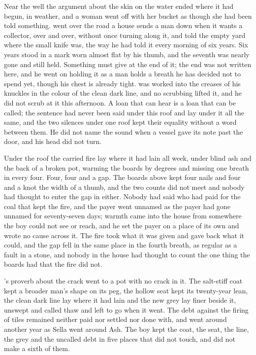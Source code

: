 Near the well the argument about the skin on the water ended where it had begun, in weather, and a woman went off with her bucket as though she had been told something.  went over the road a house sends a man down when it wants a collector, over and over, without once turning along it, and told the empty yard where the small knife was, the way he had told it every morning of six years. Six years stood in a mark worn almost flat by his thumb, and the seventh was nearly gone and still held. Something must give at the end of it; the end was not written here, and he went on holding it as a man holds a breath he has decided not to spend yet, though his chest is already tight.  was worked into the creases of his knuckles in the colour of the clean dark line, and no scrubbing lifted it, and he did not scrub at it this afternoon. A loan that can hear is a loan that can be called; the sentence had never been said under this roof and lay under it all the same, and the two silences under one roof kept their equality without a word between them. He did not name the sound when a vessel gave its note past the door, and his head did not turn.

\scenebreak

Under the roof the carried fire lay where it had lain all week, under blind ash and the back of a broken pot, warming the boards by degrees and missing one breath in every four. Four, four and a gap. The boards above kept four nails and four and a knot the width of a thumb, and the two counts did not meet and nobody had thought to enter the gap in either. Nobody had said who had paid for the coal that kept the fire, and the payer went unnamed as the payer had gone unnamed for seventy-seven days; warmth came into the house from somewhere the boy could not see or reach, and he set the payer on a place of its own and wrote no cause across it. The fire took what it was given and gave back what it could, and the gap fell in the same place in the fourth breath, as regular as a fault in a stone, and nobody in the house had thought to count the one thing the boards had that the fire did not.

's proverb about the crack went to a pot with no crack in it. The salt-stiff coat kept a broader man's shape on its peg, the hollow seat kept its twenty-year lean, the clean dark line lay where it had lain and the new grey lay finer beside it, unswept and called thaw and left to go when it went. The debt against the firing of tiles remained neither paid nor settled nor done with, and went around another year as Sella went around Ash. The boy kept the coat, the seat, the line, the grey and the uncalled debt in five places that did not touch, and did not make a sixth of them.

